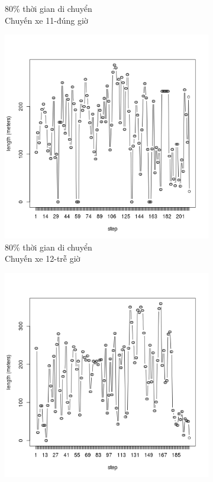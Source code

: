 \documentclass[a4paper, 13pt]{report}
\begin{document}
\begin{figure}
\begin{subfigure}[b]{0.25\textwidth}
                \caption*{80\% thời gian di chuyển\\Chuyến xe 11-đúng giờ}
        \end{subfigure}%
        \begin{subfigure}[b]{0.25\textwidth}
                \includegraphics[width=\linewidth]{test12}
                \caption*{80\% thời gian di chuyển\\Chuyến xe 12-trễ giờ}
        \end{subfigure}
        \begin{subfigure}[b]{0.25\textwidth}
                \includegraphics[width=\linewidth]{test13}

\end{subfigure}
\end{figure}
\end{document}
